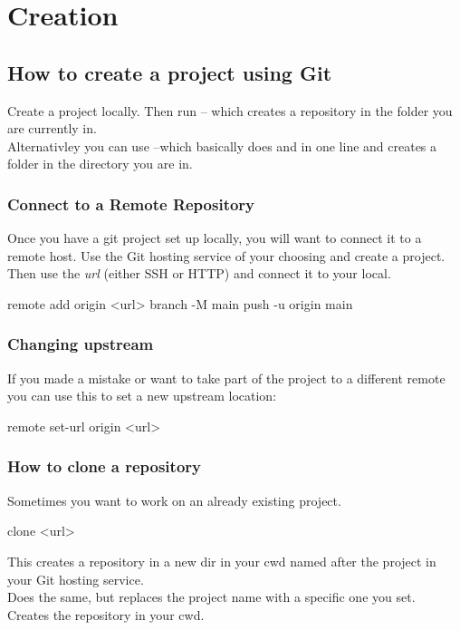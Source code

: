 \chapter{Creation}
\chapteroverlay
\chapterunderlay
\section{How to create a project using Git}
Create a project locally. Then run  -- which creates a repository in the folder you are currently in.\\
Alternativley you can use   --which basically does  and  in one line and creates a folder in the directory you are in.\\

\subsection{Connect to a Remote Repository}
Once you have a git project set up locally, you will want to connect it to a remote host. Use the Git hosting service of your choosing and create a project. Then use the \textit{url} (either SSH or HTTP) and connect it to your local.
\begin{gitBashBox}
remote add origin <url>
branch -M main
push -u origin main
\end{gitBashBox}

\subsection{Changing upstream}
If you made a mistake or want to take part of the project to a different remote you can use this to set a new upstream location:
\begin{gitBashBox}
remote set-url origin <url>
\end{gitBashBox}

\subsection{How to clone a repository}
Sometimes you want to work on an already existing project. 
\begin{gitBashBox}
clone <url>
\end{gitBashBox}
This creates a repository in a new dir in your cwd named after the project in your Git hosting service.\\
\noindent{}
Does the same, but replaces the project name with a specific one you set.\\
\noindent{}
Creates the repository in your cwd.